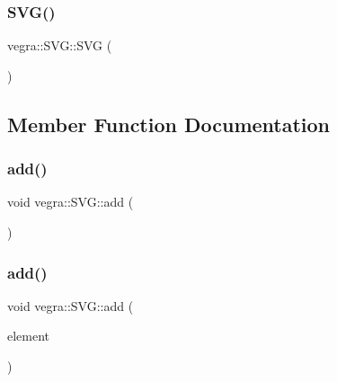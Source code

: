 \subsubsection{\texorpdfstring{S\+V\+G()}{SVG()}}
{\footnotesize\ttfamily vegra\+::\+S\+V\+G\+::\+S\+VG (\begin{DoxyParamCaption}{ }\end{DoxyParamCaption})\hspace{0.3cm}{\ttfamily [inline]}}



\subsection{Member Function Documentation}
\mbox{\label{structvegra_1_1SVG_a018d3d664341f68deff0a170885bac05}} 
\subsubsection{\texorpdfstring{add()}{add()}\hspace{0.1cm}{\footnotesize\ttfamily [1/3]}}
{\footnotesize\ttfamily void vegra\+::\+S\+V\+G\+::add (\begin{DoxyParamCaption}{ }\end{DoxyParamCaption})\hspace{0.3cm}{\ttfamily [inline]}}

\mbox{\label{structvegra_1_1SVG_a7d1da466cecd8260ae1e9514b15a2ec0}} 
\subsubsection{\texorpdfstring{add()}{add()}\hspace{0.1cm}{\footnotesize\ttfamily [2/3]}}
{\footnotesize\ttfamily void vegra\+::\+S\+V\+G\+::add (\begin{DoxyParamCaption}\item[{\mbox{\hyperlink{structvegra_1_1SVGElement}{vegra\+::\+S\+V\+G\+Element}} $\ast$}]{element }\end{DoxyParamCaption})\hspace{0.3cm}{\ttfamily [inline]}}

\mbox{\label{structvegra_1_1SVG_a4c942cc22cecde5d82d796773aab772b}} 
